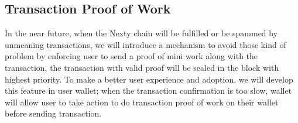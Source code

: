\documentclass[12pt,oneside]{amsart}
\begin{document}
\begin{multicols}{2}
\subsection{Transaction Proof of Work}
In the near future, when the Nexty chain will be fulfilled or be spammed by unmeaning transactions, we will introduce a mechanism to avoid those kind of problem by enforcing user to send a proof of mini work along with the transaction, the transaction with valid proof will be sealed in the block with highest priority. To make a better user experience and adoption, we will develop this feature in user wallet; when the transaction confirmation is too slow, wallet will allow user to take action to do transaction proof of work on their wallet before sending transaction.




\end{multicols}
\end{document}
